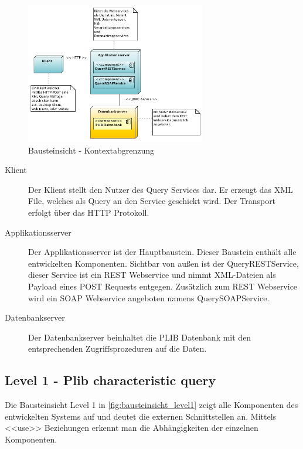 \begin{figure}[!htbp]
	\centering
		\includegraphics[width=0.7\textwidth]{images/bausteinsicht_plib_level0.png}
	\caption{Bausteinsicht - Kontextabgrenzung}
	\label{fig:bausteinsicht_level0}
\end{figure}

\begin{description}
\item[Klient] Der Klient stellt den Nutzer des Query Services dar. Er erzeugt das XML File, welches als Query an den Service geschickt wird. Der Transport erfolgt über das HTTP Protokoll. 
\item[Applikationsserver] Der Applikationsserver ist der Hauptbaustein. Dieser Baustein enthält alle entwickelten Komponenten. Sichtbar von außen ist der QueryRESTService, dieser Service ist ein \gls{REST} \gls{Webservice} und nimmt XML-Dateien als Payload eines POST Requests entgegen. Zusätzlich zum \gls{REST}  \gls{Webservice} wird ein \gls{SOAP} \gls{Webservice} angeboten namens QuerySOAPService. 
\item[Datenbankserver] Der Datenbankserver beinhaltet die PLIB Datenbank mit den entsprechenden Zugriffsprozeduren auf die Daten. 
\end{description}

\subsection{Level 1 - Plib characteristic query} 

Die Bausteinsicht Level 1 in \autoref{fig:bausteinsicht_level1} zeigt alle Komponenten des entwickelten Systems auf und deutet die externen Schnittstellen an. Mittels <<use>> Beziehungen erkennt man die Abhängigkeiten der einzelnen Komponenten. 

